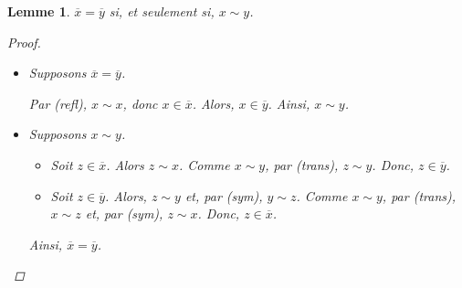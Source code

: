 \documentclass{report}
\newtheorem*{lem}{Lemme}
\theoremstyle{definition}
\theoremstyle{remark}
\begin{document}
	\begin{lem}
		$\overline{x} = \overline{y}$ si, et seulement si, $x \sim y$.
		\begin{proof}~

			\begin{itemize}
				\item[$(\Rightarrow)$] Supposons $\overline{x} = \overline{y}$.

				Par (refl), $x \sim x$, donc $x \in \overline{x}$. Alors, $x \in \overline{y}$. Ainsi, $x \sim y$.
				\item[$(\Leftarrow)$] Supposons $x \sim y$.
				\begin{itemize}
					\item[$(\subseteq)$] Soit $z \in \overline{x}$. Alors $z \sim x$. Comme $x \sim y$, par (trans), $z \sim y$. Donc, $z \in \overline{y}$.
					\item[$(\supseteq)$] Soit $z \in \overline{y}$. Alors, $z \sim y$ et, par (sym), $y \sim z$. Comme $x \sim y$, par (trans), $x \sim z$ et, par (sym), $z \sim x$. Donc, $z \in \overline{x}$.
				\end{itemize}

				Ainsi, $\overline{x} = \overline{y}$.
			\end{itemize}
		\end{proof}
	\end{lem}
\end{document}
